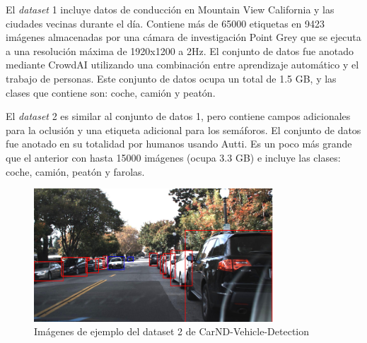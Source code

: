 El \textit{dataset} 1 incluye datos de conducción en Mountain View California y las ciudades vecinas durante el día. Contiene más de 65000 etiquetas en 9423 imágenes almacenadas por una cámara de investigación Point Grey que se ejecuta a una resolución máxima de 1920x1200 a 2Hz. El conjunto de datos fue anotado mediante CrowdAI utilizando una combinación entre aprendizaje automático y el trabajo de personas. Este conjunto de datos ocupa un total de 1.5 GB, y las clases que contiene son: coche, camión y peatón.

El \textit{dataset} 2 es similar al conjunto de datos 1, pero contiene campos adicionales para la oclusión y una etiqueta adicional para los semáforos. El conjunto de datos fue anotado en su totalidad por humanos usando Autti. Es un poco más grande que el anterior con hasta 15000 imágenes (ocupa 3.3 GB) e incluye las clases: coche, camión, peatón y farolas.
\begin{figure}[H] 
\begin{center}
	\includegraphics[width=0.8\textwidth]{figures/Estado_arte/carnd_dataset2.png}
   \caption{Imágenes de ejemplo del dataset 2 de CarND-Vehicle-Detection}
	\label{fig.carnd}
\end{center}
\end{figure}
